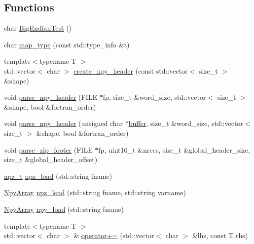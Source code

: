 \subsection*{Functions}
\begin{DoxyCompactItemize}
\item 
char \hyperlink{namespacecnpy_aa24638ba6b2f41429ee32e03295448cf}{Big\+Endian\+Test} ()
\item 
char \hyperlink{namespacecnpy_a569c852a9455b0b0c2a6ffc358155127}{map\+\_\+type} (const std\+::type\+\_\+info \&t)
\item 
{\footnotesize template$<$typename T $>$ }\\std\+::vector$<$ char $>$ \hyperlink{namespacecnpy_a9e4cd705ce96b2350ba17bfdf6f09a24}{create\+\_\+npy\+\_\+header} (const std\+::vector$<$ size\+\_\+t $>$ \&shape)
\item 
void \hyperlink{namespacecnpy_adb801e369cfcf2e47c4b0348dcb54787}{parse\+\_\+npy\+\_\+header} (F\+I\+LE $\ast$fp, size\+\_\+t \&word\+\_\+size, std\+::vector$<$ size\+\_\+t $>$ \&shape, bool \&fortran\+\_\+order)
\item 
void \hyperlink{namespacecnpy_a9ea9e228db8c205a039b7763c74829e8}{parse\+\_\+npy\+\_\+header} (unsigned char $\ast$\hyperlink{printf_8h_ae986769e0053f875cd11c9fa4d22c8a8}{buffer}, size\+\_\+t \&word\+\_\+size, std\+::vector$<$ size\+\_\+t $>$ \&shape, bool \&fortran\+\_\+order)
\item 
void \hyperlink{namespacecnpy_a0feec097a7dbb48c449bc7e9b27b7fd6}{parse\+\_\+zip\+\_\+footer} (F\+I\+LE $\ast$fp, uint16\+\_\+t \&nrecs, size\+\_\+t \&global\+\_\+header\+\_\+size, size\+\_\+t \&global\+\_\+header\+\_\+offset)
\item 
\hyperlink{namespacecnpy_acfea2d25a7c0e41b79f04864b0a64a2b}{npz\+\_\+t} \hyperlink{namespacecnpy_ab6ef932e48b81bddc5457ff4ceb44a3a}{npz\+\_\+load} (std\+::string fname)
\item 
\hyperlink{structcnpy_1_1_npy_array}{Npy\+Array} \hyperlink{namespacecnpy_abfeb43960d51a799dbe718b3d73e8b52}{npz\+\_\+load} (std\+::string fname, std\+::string varname)
\item 
\hyperlink{structcnpy_1_1_npy_array}{Npy\+Array} \hyperlink{namespacecnpy_abffb25587a54473fbe1d3c86fa4df4fb}{npy\+\_\+load} (std\+::string fname)
\item 
{\footnotesize template$<$typename T $>$ }\\std\+::vector$<$ char $>$ \& \hyperlink{namespacecnpy_ac8daa2ff90ad9f02b13e8a6f6b88bca6}{operator+=} (std\+::vector$<$ char $>$ \&lhs, const T rhs)

\end{DoxyCompactItemize}
